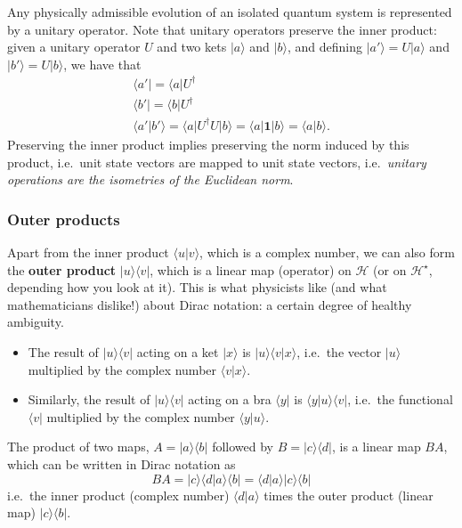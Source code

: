\documentclass[fleqn]{article}
\providecommand{\tightlist}{%
  \setlength{\itemsep}{0pt}\setlength{\parskip}{0pt}}
\begin{document}
Any physically admissible evolution of an isolated quantum system is represented by a unitary operator.
Note that unitary operators preserve the inner product: given a unitary operator \(U\) and two kets \(|a\rangle\) and \(|b\rangle\), and defining \(|a'\rangle=U|a\rangle\) and \(|b'\rangle=U|b\rangle\), we have that
\[
  \begin{gathered}
    \langle a'|=\langle a|U^\dagger
  \\\langle b'|=\langle b|U^\dagger
  \\\langle a'|b'\rangle=\langle a|U^\dagger U|b\rangle=\langle a|\mathbf{1}|b\rangle=\langle a|b\rangle.
  \end{gathered}
\]
Preserving the inner product implies preserving the norm induced by this product, i.e.~unit state vectors are mapped to unit state vectors, i.e.~\emph{unitary operations are the isometries of the Euclidean norm}.

\hypertarget{outer-products}{%
\subsubsection{Outer products}\label{outer-products}}

Apart from the inner product \(\langle u|v\rangle\), which is a complex number, we can also form the \textbf{outer product} \(|u\rangle\langle v|\), which is a linear map (operator) on \(\mathcal{H}\) (or on \(\mathcal{H}^\star\), depending how you look at it).
This is what physicists like (and what mathematicians dislike!) about Dirac notation: a certain degree of healthy ambiguity.

\begin{itemize}
\tightlist
\item
  The result of \(|u\rangle\langle v|\) acting on a ket \(|x\rangle\) is \(|u\rangle\langle v|x\rangle\), i.e.~the vector \(|u\rangle\) multiplied by the complex number \(\langle v|x\rangle\).
\item
  Similarly, the result of \(|u\rangle\langle v|\) acting on a bra \(\langle y|\) is \(\langle y|u\rangle\langle v|\), i.e.~the functional \(\langle v|\) multiplied by the complex number \(\langle y|u\rangle\).
\end{itemize}

The product of two maps, \(A=|a\rangle\langle b|\) followed by \(B=|c\rangle\langle d|\), is a linear map \(BA\), which can be written in Dirac notation as
\[
  BA = |c\rangle\langle d|a\rangle\langle b| = \langle d|a\rangle|c\rangle\langle b|
\]
i.e.~the inner product (complex number) \(\langle d|a\rangle\) times the outer product (linear map) \(|c\rangle\langle b|\).
\end{document}
